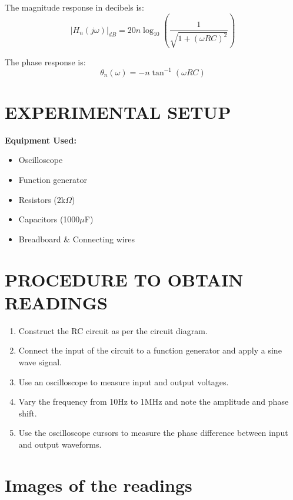 \documentclass[a4paper,12pt]{article}
\begin{document}
The magnitude response in decibels is:
\begin{equation}
|H_n(j\omega)|_{dB} = 20n \log_{10} \left(\frac{1}{\sqrt{1 + (\omega RC)^2}} \right)
\end{equation}

The phase response is:
\begin{equation}
\theta_n(\omega) = -n \tan^{-1}(\omega RC)
\end{equation}

\section{\textcolor{myred}{EXPERIMENTAL SETUP}}
\textbf{Equipment Used:}
\begin{itemize}
    \item Oscilloscope
    \item Function generator
    \item Resistors (2k$\Omega$)
    \item Capacitors (1000$\mu$F)
    \item Breadboard \& Connecting wires
\end{itemize}

\section{\textcolor{myred}{PROCEDURE TO OBTAIN READINGS}}
\begin{enumerate}
    \item Construct the RC circuit as per the circuit diagram.
    \item Connect the input of the circuit to a function generator and apply a sine wave signal.
    \item Use an oscilloscope to measure input and output voltages.
    \item Vary the frequency from 10Hz to 1MHz and note the amplitude and phase shift.
    \item Use the oscilloscope cursors to measure the phase difference between input and output waveforms.
\end{enumerate}

\section{\textcolor{myred}{Images of the readings}}
\end{document}
